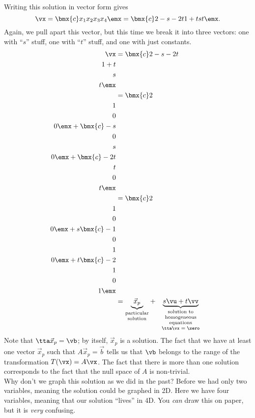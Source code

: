 {Writing this solution in vector form gives 
\[
\vx = \bmx{c}x_1\\x_2\\x_3\\x_4\emx = \bmx{c}2-s-2t\\1+t\\s\\t\emx.
\]
Again, we pull apart this vector, but this time we break it into three vectors: one with ``$s$'' stuff, one with ``$t$'' stuff, and one with just constants. 
\begin{align*}
 \vx &= \bmx{c}2-s-2t\\1+t\\s\\t\emx \\
     &= \bmx{c}2\\1\\0\\0\emx + \bmx{c}-s\\0\\s\\0\emx + \bmx{c}-2t\\t\\0\\t\emx \\ 
     &=\bmx{c}2\\1\\0\\0\emx+s\bmx{c}-1\\0\\1\\0\emx + t\bmx{c}-2\\1\\0\\1\emx\\
     &=\underbrace{\vec{x}_p}_{\parbox{35pt}{\center {\vskip -10 pt} \scriptsize particular solution}}+\underbrace{s\vu + t\vv}_{\parbox{70pt}{\center {\vskip -10 pt} \scriptsize solution to homogeneous equations $\tta\vx=\zero$}}
\end{align*}
Note that $\tta\vec{x}_p = \vb$; by itself, $\vec{x}_p$ is a solution. The fact that we have at least one vector $\vec{x}_p$ such that $A\vec{x}_p=\vec{b}$ tells us that $\vb$ belongs to the range of the transformation $T(\vx) = A\vx$. The fact that there is more than one solution corresponds to the fact that the null space of $A$ is non-trivial.\\

Why don't we graph this solution as we did in the past? Before we had only two variables, meaning the solution could be graphed in 2D. Here we have four variables, meaning that our solution ``lives'' in 4D. You \textit{can} draw this on paper, but it is \textit{very} confusing.}

